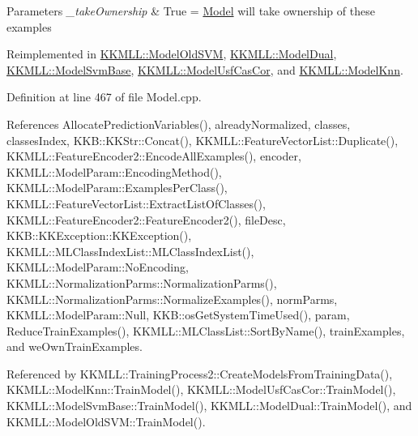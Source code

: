 \begin{DoxyParams}{Parameters}
{\em \+\_\+take\+Ownership} & True = \hyperlink{class_k_k_m_l_l_1_1_model}{Model} will take ownership of these examples \\
\hline
\end{DoxyParams}


Reimplemented in \hyperlink{class_k_k_m_l_l_1_1_model_old_s_v_m_a38047608aa2f3ce8321edf77ea24207b}{K\+K\+M\+L\+L\+::\+Model\+Old\+S\+VM}, \hyperlink{class_k_k_m_l_l_1_1_model_dual_a9265e828fc1f34ad3fb955201007a1cc}{K\+K\+M\+L\+L\+::\+Model\+Dual}, \hyperlink{class_k_k_m_l_l_1_1_model_svm_base_a05f43d6e02a04d6a00079f7d85459eff}{K\+K\+M\+L\+L\+::\+Model\+Svm\+Base}, \hyperlink{class_k_k_m_l_l_1_1_model_usf_cas_cor_a4bcd5585f141a9e11852e851e5fa9904}{K\+K\+M\+L\+L\+::\+Model\+Usf\+Cas\+Cor}, and \hyperlink{class_k_k_m_l_l_1_1_model_knn_a4dac911ec83b0967ec87062beb2697d7}{K\+K\+M\+L\+L\+::\+Model\+Knn}.



Definition at line 467 of file Model.\+cpp.



References Allocate\+Prediction\+Variables(), already\+Normalized, classes, classes\+Index, K\+K\+B\+::\+K\+K\+Str\+::\+Concat(), K\+K\+M\+L\+L\+::\+Feature\+Vector\+List\+::\+Duplicate(), K\+K\+M\+L\+L\+::\+Feature\+Encoder2\+::\+Encode\+All\+Examples(), encoder, K\+K\+M\+L\+L\+::\+Model\+Param\+::\+Encoding\+Method(), K\+K\+M\+L\+L\+::\+Model\+Param\+::\+Examples\+Per\+Class(), K\+K\+M\+L\+L\+::\+Feature\+Vector\+List\+::\+Extract\+List\+Of\+Classes(), K\+K\+M\+L\+L\+::\+Feature\+Encoder2\+::\+Feature\+Encoder2(), file\+Desc, K\+K\+B\+::\+K\+K\+Exception\+::\+K\+K\+Exception(), K\+K\+M\+L\+L\+::\+M\+L\+Class\+Index\+List\+::\+M\+L\+Class\+Index\+List(), K\+K\+M\+L\+L\+::\+Model\+Param\+::\+No\+Encoding, K\+K\+M\+L\+L\+::\+Normalization\+Parms\+::\+Normalization\+Parms(), K\+K\+M\+L\+L\+::\+Normalization\+Parms\+::\+Normalize\+Examples(), norm\+Parms, K\+K\+M\+L\+L\+::\+Model\+Param\+::\+Null, K\+K\+B\+::os\+Get\+System\+Time\+Used(), param, Reduce\+Train\+Examples(), K\+K\+M\+L\+L\+::\+M\+L\+Class\+List\+::\+Sort\+By\+Name(), train\+Examples, and we\+Own\+Train\+Examples.



Referenced by K\+K\+M\+L\+L\+::\+Training\+Process2\+::\+Create\+Models\+From\+Training\+Data(), K\+K\+M\+L\+L\+::\+Model\+Knn\+::\+Train\+Model(), K\+K\+M\+L\+L\+::\+Model\+Usf\+Cas\+Cor\+::\+Train\+Model(), K\+K\+M\+L\+L\+::\+Model\+Svm\+Base\+::\+Train\+Model(), K\+K\+M\+L\+L\+::\+Model\+Dual\+::\+Train\+Model(), and K\+K\+M\+L\+L\+::\+Model\+Old\+S\+V\+M\+::\+Train\+Model().


